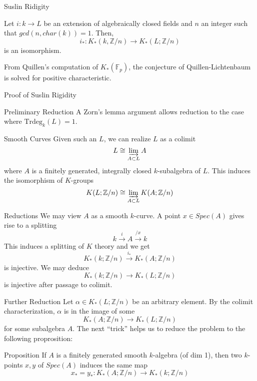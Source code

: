 \documentclass{beamer}
\begin{document}
\begin{frame}{Suslin Ridigity}
  \begin{theorem}[Suslin, 83]
   Let $i: k\to L$ be an extension of algebraically closed fields and $n$ an integer such that $gcd(n, char(k))=1$. Then,
   \[i_*: K_*(k, \mathbb{Z}/n)\to K_*(L;\mathbb{Z}/n)\]
   is an isomorphism.
  \end{theorem}

  From Quillen's computation of $K_*(\mathbb{F}_p)$, the conjecture of Quillen-Lichtenbaum is solved for positive characteristic. 



\end{frame}



\begin{frame}{Proof of Suslin Rigidity}

\begin{block}{Preliminary Reduction}
A Zorn's lemma argument allows reduction to the case where $\textrm{Trdeg}_k(L)=1$.
\end{block}

\vfill
\vfill

\end{frame}

\begin{frame}{Smooth Curves}
Given such an $L$, we can realize $L$ as a colimit 
\[L\cong \varinjlim_{A\subset L}A\]
where $A$ is a finitely generated, integrally closed $k$-subalgebra of $L$. \pause This induces the isomorphism of $K$-groups 
\[K(L; \mathbb{Z}/n)\cong \varinjlim_{A\subset L}K(A; \mathbb{Z}/n)\]
  
\end{frame}



\begin{frame}{Reductions}
We may view $A$ as a smooth $k$-curve. A point $x\in Spec(A)$ gives rise to a splitting 
\[k\xrightarrow{i}A\xrightarrow{/x}k\] \pause
This induces a splitting of $K$ theory and we get 
\[K_*(k; \mathbb{Z}/n)\xrightarrow{i_*} K_*(A; \mathbb{Z}/n)\]
is injective. \pause We may deduce 
\[K_*(k; \mathbb{Z}/n)\to K_*(L; \mathbb{Z}/n)\] is injective after passage to colimit.
\end{frame}

\begin{frame}{Further Reduction}
  Let $\alpha\in K_*(L; \mathbb{Z}/n)$ be an arbitrary element. By the colimit characterization, $\alpha$ is in the image of some 
  \[K_*(A; \mathbb{Z}/n)\to K_*(L;\mathbb{Z}/n)\]
  for some subalgebra $A$. The next ``trick'' helps us to reduce the problem to the following proprosition:
  
\begin{block}{Proposition}
  \label{reduction1}
If $A$ is a finitely generated smooth $k$-algebra (of $\textrm{dim}$ 1), then  two $k$-points $x,y$ of $Spec(A)$ induces the same map 
\[x_*=y_*: K_*(A; \mathbb{Z}/n)\to K_*(k; \mathbb{Z}/n)\]  
\end{block}




\end{frame}
  
\end{document}
